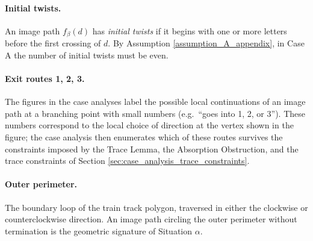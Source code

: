 \paragraph{Initial twists.}
An image path $f_\beta(d)$ has \emph{initial twists} if it begins with one or more letters before the first crossing of $d$. By Assumption \ref{assumption_A_appendix}, in Case A the number of initial twists must be even.

\paragraph{Exit routes 1, 2, 3.}
The figures in the case analyses label the possible local continuations of an image path at a branching point with small numbers (e.g.\ ``goes into 1, 2, or 3''). These numbers correspond to the local choice of direction at the vertex shown in the figure; the case analysis then enumerates which of these routes survives the constraints imposed by the Trace Lemma, the Absorption Obstruction, and the trace constraints of Section \ref{sec:case_analysis_trace_constraints}.

\paragraph{Outer perimeter.}
The boundary loop of the train track polygon, traversed in either the clockwise or counterclockwise direction. An image path circling the outer perimeter without termination is the geometric signature of Situation $\alpha$.